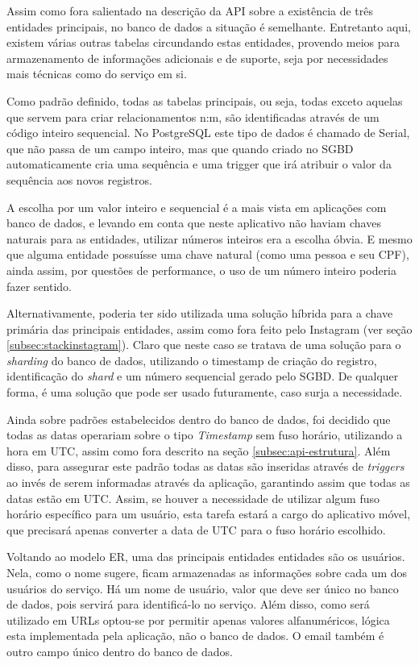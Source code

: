 \documentclass[diss]{template/setrem}
\begin{document}
Assim como fora salientado na descrição da API sobre a existência de três entidades principais, no banco de dados a situação é semelhante. Entretanto aqui, existem várias outras tabelas circundando estas entidades, provendo meios para armazenamento de informações adicionais e de suporte, seja por necessidades mais técnicas como do serviço em si.

Como padrão definido, todas as tabelas principais, ou seja, todas exceto aquelas que servem para criar relacionamentos n:m, são identificadas através de um código inteiro sequencial. No PostgreSQL este tipo de dados é chamado de Serial, que não passa de um campo inteiro, mas que quando criado no SGBD automaticamente cria uma sequência e uma trigger que irá atribuir o valor da sequência aos novos registros.

A escolha por um valor inteiro e sequencial é a mais vista em aplicações com banco de dados, e levando em conta que neste aplicativo não haviam chaves naturais para as entidades, utilizar números inteiros era a escolha óbvia. E mesmo que alguma entidade possuísse uma chave natural (como uma pessoa e seu CPF), ainda assim, por questões de performance, o uso de um número inteiro poderia fazer sentido.

Alternativamente, poderia ter sido utilizada uma solução híbrida para a chave primária das principais entidades, assim como fora feito pelo Instagram (ver seção \ref{subsec:stackinstagram}). Claro que neste caso se tratava de uma solução para o \emph{sharding} do banco de dados, utilizando o timestamp de criação do registro, identificação do \emph{shard} e um número sequencial gerado pelo SGBD. De qualquer forma, é uma solução que pode ser usado futuramente, caso surja a necessidade.

Ainda sobre padrões estabelecidos dentro do banco de dados, foi decidido que todas as datas operariam sobre o tipo \emph{Timestamp} sem fuso horário, utilizando a hora em UTC, assim como fora descrito na seção \ref{subsec:api-estrutura}. Além disso, para assegurar este padrão todas as datas são inseridas através de \emph{triggers} ao invés de serem informadas através da aplicação, garantindo assim que todas as datas estão em UTC. Assim, se houver a necessidade de utilizar algum fuso horário específico para um usuário, esta tarefa estará a cargo do aplicativo móvel, que precisará apenas converter a data de UTC para o fuso horário escolhido.

Voltando ao modelo ER, uma das principais entidades entidades são os usuários. Nela, como o nome sugere, ficam armazenadas as informações sobre cada um dos usuários do serviço. Há um nome de usuário, valor que deve ser único no banco de dados, pois servirá para identificá-lo no serviço. Além disso, como será utilizado em URLs optou-se por permitir apenas valores alfanuméricos, lógica esta implementada pela aplicação, não o banco de dados. O email também é outro campo único dentro do banco de dados.
\end{document}
